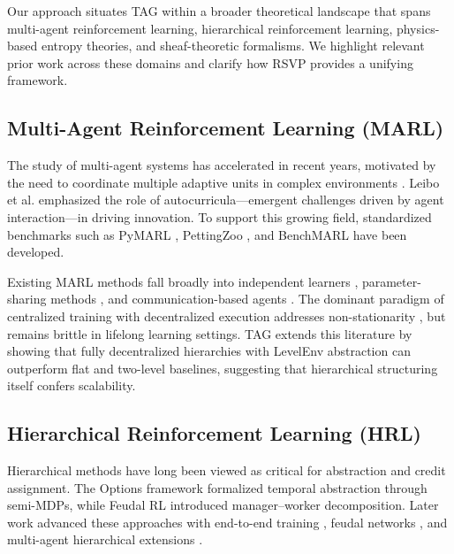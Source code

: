 \documentclass[11pt,a4paper]{article}
\begin{document}
Our approach situates TAG \citep{paolo2025tag} within a broader theoretical
landscape that spans multi-agent reinforcement learning, hierarchical
reinforcement learning, physics-based entropy theories, and sheaf-theoretic
formalisms. We highlight relevant prior work across these domains and clarify
how RSVP provides a unifying framework.

\subsection{Multi-Agent Reinforcement Learning (MARL)}

The study of multi-agent systems has accelerated in recent years, motivated by
the need to coordinate multiple adaptive units in complex environments
\citep{nguyen2020multi,oroojlooy2023marl}. Leibo et al.
\citep{leibo2019autocurricula} emphasized the role of autocurricula—emergent
challenges driven by agent interaction—in driving innovation. To support this
growing field, standardized benchmarks such as PyMARL
\citep{samvelyan2019pymarl}, PettingZoo \citep{terry2021pettingzoo}, and
BenchMARL \citep{bettini2024benchmarl} have been developed.

Existing MARL methods fall broadly into independent learners
\citep{thorpe1997q,de2020ippo}, parameter-sharing methods \citep{yu2021mappo},
and communication-based agents \citep{foerster2016comm,jorge2016comm}. The
dominant paradigm of centralized training with decentralized execution
addresses non-stationarity \citep{oroojlooy2023marl}, but remains brittle in
lifelong learning settings. TAG extends this literature by showing that fully
decentralized hierarchies with LevelEnv abstraction can outperform flat and
two-level baselines, suggesting that hierarchical structuring itself confers
scalability.

\subsection{Hierarchical Reinforcement Learning (HRL)}

Hierarchical methods have long been viewed as critical for abstraction and
credit assignment. The Options framework \citep{sutton1999between} formalized
temporal abstraction through semi-MDPs, while Feudal RL \citep{dayan1992feudal}
introduced manager–worker decomposition. Later work advanced these approaches
with end-to-end training \citep{bacon2017optioncritic}, feudal networks
\citep{vezhnevets2017feudal}, and multi-agent hierarchical extensions
\citep{nachum2019multi,yang2021hierarchical}.
\end{document}
